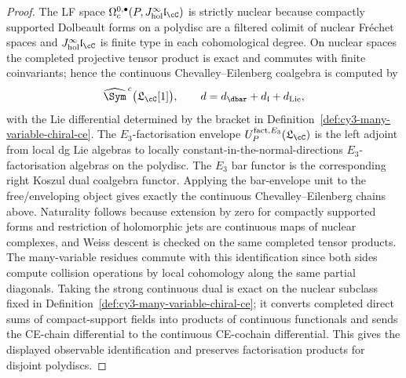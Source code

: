 \begin{proof}
The LF space
$\Omega^{0,\bullet}_c(P,J^\infty_{\mathrm{hol}}\mathfrak l_{\cC})$ is
strictly nuclear because compactly supported Dolbeault forms on a
polydisc are a filtered colimit of nuclear Fr\'echet spaces and
$J^\infty_{\mathrm{hol}}\mathfrak l_{\cC}$ is finite type in each
cohomological degree. On nuclear spaces the completed projective tensor
product is exact and commutes with finite coinvariants; hence the
continuous Chevalley--Eilenberg coalgebra is computed by
\[
 \widehat{\Sym}^{\,c}
 \bigl(\mathfrak L_{\cC}[1]\bigr),
 \qquad
 d=d_{\dbar}+d_{\mathfrak l}+d_{\mathrm{Lie}},
\]
with the Lie differential determined by the bracket in
Definition~\ref{def:cy3-many-variable-chiral-ce}. The
$E_3$-factorisation envelope
$U^{\mathrm{fact},E_3}_{P}(\mathfrak L_{\cC})$ is the left adjoint from
local dg Lie algebras to locally constant-in-the-normal-directions
$E_3$-factorisation algebras on the polydisc. The $E_3$ bar functor is
the corresponding right Koszul dual coalgebra functor. Applying the
bar-envelope unit to the free/enveloping object gives exactly the
continuous Chevalley--Eilenberg chains above. Naturality follows
because extension by zero for compactly supported forms and restriction
of holomorphic jets are continuous maps of nuclear complexes, and Weiss
descent is checked on the same completed tensor products. The
many-variable residues commute with this identification since both sides
compute collision operations by local cohomology along the same partial
diagonals. Taking the strong continuous dual is exact on the nuclear
subclass fixed in Definition~\ref{def:cy3-many-variable-chiral-ce}; it
converts completed direct sums of compact-support fields into products
of continuous functionals and sends the CE-chain differential to the
continuous CE-cochain differential. This gives the displayed observable
identification and preserves factorisation products for disjoint
polydiscs.
\end{proof}

